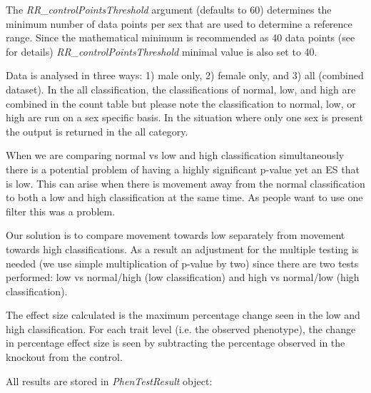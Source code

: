 \documentclass[12pt,a4paper]{article}
\begin{document}
The \textit{RR\_controlPointsThreshold} argument (defaults to 60)  determines the minimum number of data points per sex that are used to determine a reference range.  Since the mathematical minimum is recommended as 40 data points (see \cite{Solberg} for details) \textit{RR\_controlPointsThreshold} minimal value is also set to 40.

Data is analysed in three ways: 1) male only, 2) female only, and 3)  all (combined dataset). In the all classification, the classifications of normal, low, and high are combined in the count table but please note the classification to normal, low, or high are run on a sex specific basis.  In the situation where only one sex is present the output is returned in the all category.

When we are comparing normal vs low and high classification simultaneously there is a potential problem of having a highly significant p-value yet an ES that is low. This can arise when there is movement away from the normal classification to both a low and high classification at the same time. As people want to use one filter this was a problem. 

Our solution is to compare movement towards low separately from movement towards high classifications. As a result an adjustment for the multiple testing is needed (we use simple multiplication of p-value by two) since there are two tests performed: low vs normal/high (low classification) and high vs normal/low (high classification).  

The effect size calculated is the maximum percentage change seen in the low and high classification. For each trait level (i.e. the observed phenotype), the change in percentage effect size is seen by subtracting the percentage observed in the knockout from the control.

All results are stored in \textit{PhenTestResult} object:
\end{document}
